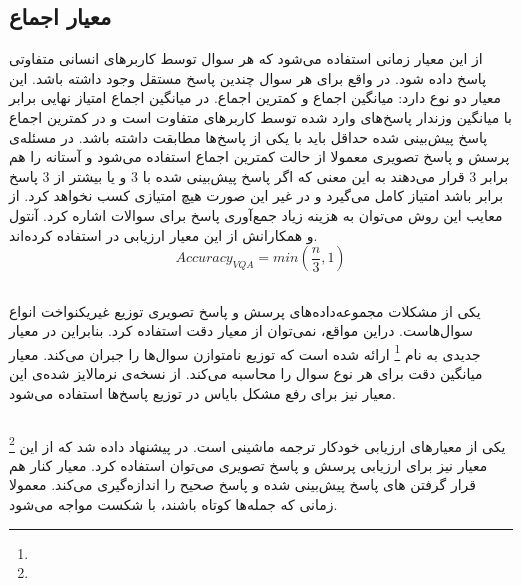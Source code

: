 \subsection{معیار اجماع}

		از این معیار زمانی استفاده می‌شود که هر سوال توسط کاربرهای انسانی متفاوتی پاسخ داده شود. در واقع برای هر سوال چندین پاسخ مستقل وجود داشته باشد. این معیار دو نوع دارد: میانگین اجماع و کمترین اجماع. در میانگین اجماع امتیاز نهایی برابر با میانگین وزندار پاسخ‌های وارد شده توسط کاربرهای متفاوت است و در کمترین اجماع پاسخ پیش‌بینی شده حداقل باید با یکی از پاسخ‌ها مطابقت داشته باشد. در مسئله‌ی پرسش و پاسخ تصویری معمولا از حالت کمترین اجماع استفاده می‌شود و آستانه را هم برابر 3 قرار می‌دهند به این معنی که اگر پاسخ پیش‌بینی شده با 3 و یا بیشتر از 3 پاسخ برابر باشد امتیاز کامل می‌گیرد و در غیر این صورت هیچ امتیازی کسب نخواهد کرد. از معایب این روش می‌توان به هزینه زیاد جمع‌آوری پاسخ برای سوالات اشاره کرد. آنتول و همکارانش از این معیار ارزیابی در 
		\cite{antol2015vqa}
		استفاده کرده‌اند.
		\begin{equation}
			Accuracy_{VQA} = min(\frac{n}{3}, 1)
		\end{equation}

\subsection{\cite{kafle2017analysis}}

		یکی از مشکلات مجموعه‌داده‌های پرسش و پاسخ تصویری توزیع غیریکنواخت انواع سوال‌هاست. دراین مواقع، نمی‌توان از معیار دقت استفاده کرد. بنابراین  در 
	\cite{kafle2017analysis}
		 معیار جدیدی به نام 
	\footnote{}
		ارائه شده است که توزیع نامتوازن سوال‌ها را جبران می‌کند. معیار 
	میانگین دقت برای هر نوع سوال را محاسبه می‌کند. از نسخه‌ی نرمالایز شده‌ی این معیار نیز برای رفع مشکل بایاس در توزیع پاسخ‌ها استفاده می‌شود.


\subsection{\cite{papineni2002bleu}}

		\footnote{}
		یکی از معیارهای ارزیابی خودکار ترجمه ماشینی است. در
		\cite{gurari2018vizwiz}
		 پیشنهاد داده شد که از این معیار نیز برای ارزیابی پرسش و پاسخ تصویری می‌توان استفاده کرد. معیار 
		کنار هم قرار گرفتن 
		های پاسخ پیش‌‌بینی شده و پاسخ صحیح را اندازه‌گیری می‌کند. معمولا
	زمانی که جمله‌ها کوتاه باشند، با شکست مواجه می‌‌شود.
		


